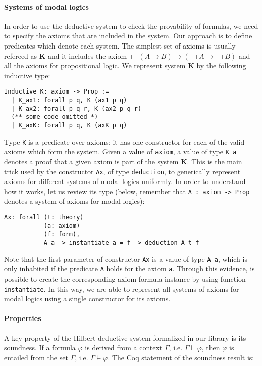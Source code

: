 \documentclass[sigconf,anonymous]{acmart}
\begin{document}
\paragraph{Systems of modal logics} In order to use the deductive system to
check the provability of formulas, we need to specify the axioms that are
included in the system. Our approach is to define predicates
which denote each system. The simplest set of axioms is usually refereed as
\textbf{K} and it includes the axiom $\Box(A \to B) \to (\Box A \to \Box B)$
and all the axioms for propositional logic. We represent system \textbf{K}
by the following inductive type:
\begin{verbatim}
Inductive K: axiom -> Prop :=
  | K_ax1: forall p q, K (ax1 p q)
  | K_ax2: forall p q r, K (ax2 p q r)
  (** some code omitted *)
  | K_axK: forall p q, K (axK p q)
\end{verbatim}
Type \texttt{K} is a predicate over axioms: it has one constructor for
each of the valid axioms which form the system. Given a value
of \texttt{axiom}, a value of type \texttt{K a} denotes a
proof that a given axiom is part of the system \textbf{K}. This is the main
trick used by the constructor \texttt{Ax}, of type
\texttt{deduction}, to generically represent axioms for
different systems of modal logics uniformly. In order to understand how it
works, let us review its type (below, remember that \texttt{A : axiom -> Prop}
denotes a system of axioms for modal logics):
\begin{verbatim}
Ax: forall (t: theory)
           (a: axiom)
           (f: form),
           A a -> instantiate a = f -> deduction A t f
\end{verbatim}
Note that the first parameter of constructor \texttt{Ax} is a value
of type \texttt{A a}, which is only inhabited if the predicate
\texttt{A} holds for the axiom \texttt{a}. Through this
evidence, is possible to create the corresponding axiom formula instance by
using function \texttt{instantiate}. In this way, we are able to
represent all systems of axioms for modal logics using a single constructor
for its axioms.

\paragraph{Properties} A key property of the Hilbert deductive system formalized
in our library is its soundness. If a formula $\varphi$ is derived from a
context $\Gamma$, i.e. $\Gamma\vdash\varphi$, then $\varphi$ is entailed from
the set $\Gamma$, i.e. $\Gamma\models\varphi$. The Coq statement of the soundness
result is:
\end{document}
